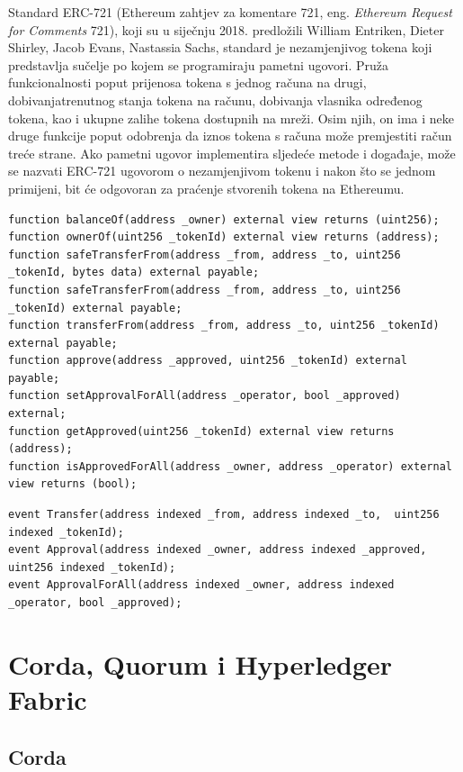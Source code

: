 \documentclass[times, utf8, diplomski]{fer}
\begin{document}
Standard ERC-721 (Ethereum zahtjev za komentare 721, eng. \textit{Ethereum Request for Comments} 721), koji su u siječnju 2018. predložili William Entriken, Dieter Shirley, Jacob Evans, Nastassia Sachs, standard je nezamjenjivog tokena koji predstavlja sučelje po kojem se programiraju pametni ugovori. Pruža funkcionalnosti poput prijenosa tokena s jednog računa na drugi, dobivanjatrenutnog stanja tokena na računu, dobivanja vlasnika određenog tokena, kao i ukupne zalihe tokena dostupnih na mreži. Osim njih, on ima i neke druge funkcije poput odobrenja da iznos tokena s računa može premjestiti račun treće strane.
Ako pametni ugovor implementira sljedeće metode i događaje, može se nazvati ERC-721 ugovorom o nezamjenjivom tokenu i nakon što se jednom primijeni, bit će odgovoran za praćenje stvorenih tokena na Ethereumu.

\begin{lstlisting}
function balanceOf(address _owner) external view returns (uint256);
function ownerOf(uint256 _tokenId) external view returns (address);
function safeTransferFrom(address _from, address _to, uint256 _tokenId, bytes data) external payable;
function safeTransferFrom(address _from, address _to, uint256 _tokenId) external payable;
function transferFrom(address _from, address _to, uint256 _tokenId) external payable;
function approve(address _approved, uint256 _tokenId) external payable;
function setApprovalForAll(address _operator, bool _approved) external;
function getApproved(uint256 _tokenId) external view returns (address);
function isApprovedForAll(address _owner, address _operator) external view returns (bool);
\end{lstlisting}
\begin{lstlisting}
event Transfer(address indexed _from, address indexed _to,  uint256 indexed _tokenId);
event Approval(address indexed _owner, address indexed _approved,  uint256 indexed _tokenId);
event ApprovalForAll(address indexed _owner, address indexed _operator, bool _approved);
\end{lstlisting}

\section{Corda, Quorum i Hyperledger Fabric}

\subsection{Corda}
\end{document}
